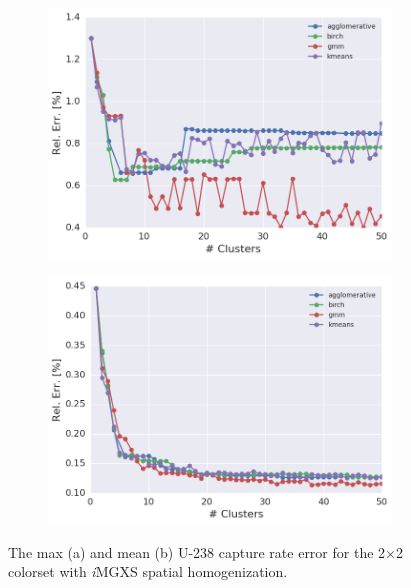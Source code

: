 \begin{figure}[h!]
\centering
\begin{subfigure}{0.9\textwidth}
  \centering
  \includegraphics[width=\linewidth]{figures/results/err-by-cluster/2x2/max-rel-err}
  \caption{}
  \label{fig:chap11-max-capt-err-by-cluster-2x2}
\end{subfigure}
\begin{subfigure}{0.9\textwidth}
  \centering
  \includegraphics[width=\linewidth]{figures/results/err-by-cluster/2x2/mean-rel-err}
  \caption{}
  \label{fig:chap11-mean-capt-err-by-cluster-2x2}
\end{subfigure}
\caption[U-238 capture rate error variation with the number of clusters]{The max (a) and mean (b) U-238 capture rate error for the 2$\times$2 colorset with \textit{i}\ac{MGXS} spatial homogenization.}
\label{fig:chap11-capt-err-by-cluster-2x2}
\end{figure}

